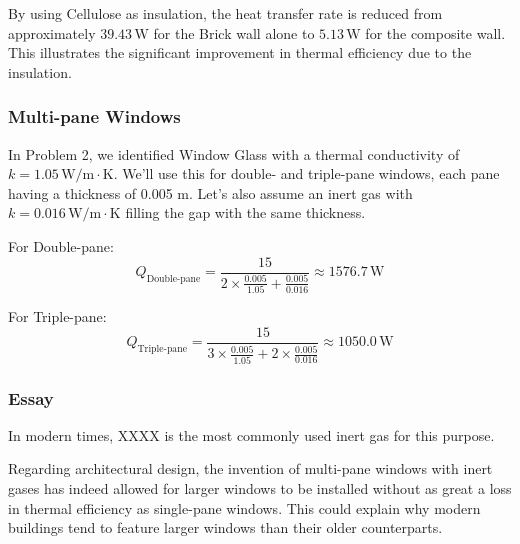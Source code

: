 \documentclass[12pt]{article}
\begin{document}
By using Cellulose as insulation, the heat transfer rate is reduced from approximately \( 39.43 \, \text{W} \) for the Brick wall alone to \( 5.13 \, \text{W} \) for the composite wall. This illustrates the significant improvement in thermal efficiency due to the insulation.


\subsubsection*{Multi-pane Windows}

In Problem 2, we identified Window Glass with a thermal conductivity of \(k = 1.05 \, \text{W/m} \cdot \text{K}\). We'll use this for double- and triple-pane windows, each pane having a thickness of 0.005 m. Let's also assume an inert gas with \(k = 0.016 \, \text{W/m} \cdot \text{K}\) filling the gap with the same thickness.

For Double-pane:
\[
Q_{\text{Double-pane}} = \frac{15}{2 \times \frac{0.005}{1.05} + \frac{0.005}{0.016}} \approx 1576.7 \, \text{W}
\]

For Triple-pane:
\[
Q_{\text{Triple-pane}} = \frac{15}{3 \times \frac{0.005}{1.05} + 2 \times \frac{0.005}{0.016}} \approx 1050.0 \, \text{W}
\]

\subsubsection*{Essay}

In modern times, XXXX is the most commonly used inert gas for this purpose.

Regarding architectural design, the invention of multi-pane windows with inert gases has indeed allowed for larger windows to be installed without as great a loss in thermal efficiency as single-pane windows. This could explain why modern buildings tend to feature larger windows than their older counterparts.
\end{document}
